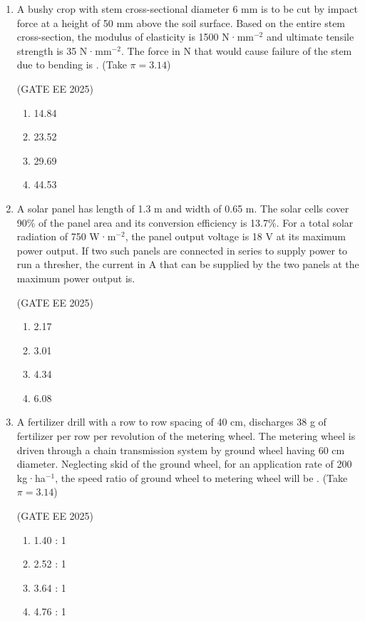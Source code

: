 \documentclass[journal,12pt,onecolumn]{IEEEtran}
\theoremstyle{remark}
\begin{document}
\begin{enumerate}
\item A bushy crop with stem cross-sectional diameter 6 mm is to be cut by impact force at a height of 50 mm above the soil surface. Based on the entire stem cross-section, the modulus of elasticity is 1500 N·mm$^{-2}$ and ultimate tensile strength is 35 N·mm$^{-2}$. The force in N that would cause failure of the stem due to bending is . (Take $\pi = 3.14$)

\hfill(GATE EE 2025)

\begin{multicols}{4}
\begin{enumerate}
\item 14.84
\item 23.52
\item 29.69
\item 44.53
\end{enumerate}
\end{multicols}

\item A solar panel has length of 1.3 m and width of 0.65 m. The solar cells cover 90\% of the panel area and its conversion efficiency is 13.7\%. For a total solar radiation of 750 W·m$^{-2}$, the panel output voltage is 18 V at its maximum power output. If two such panels are connected in series to supply power to run a thresher, the current in A that can be supplied by the two panels at the maximum power output is.

\hfill(GATE EE 2025)

\begin{multicols}{4}
\begin{enumerate}
\item 2.17
\item 3.01
\item 4.34
\item 6.08
\end{enumerate}
\end{multicols}

\item A fertilizer drill with a row to row spacing of 40 cm, discharges 38 g of fertilizer per row per revolution of the metering wheel. The metering wheel is driven through a chain transmission system by ground wheel having 60 cm diameter. Neglecting skid of the ground wheel, for an application rate of 200 kg·ha$^{-1}$, the speed ratio of ground wheel to metering wheel will be . (Take $\pi = 3.14$)

\hfill(GATE EE 2025)

\begin{multicols}{4}
\begin{enumerate}
\item 1.40 : 1
\item 2.52 : 1
\item 3.64 : 1
\item 4.76 : 1
\end{enumerate}
\end{multicols}


\end{enumerate}
\end{document}
